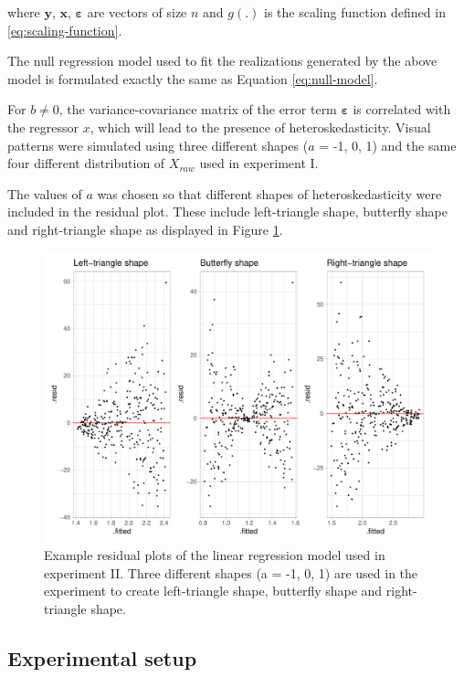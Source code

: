 \documentclass[]{interact}
\theoremstyle{plain}%
\theoremstyle{definition}
\theoremstyle{remark}
\begin{document}
where \(\boldsymbol{y}\), \(\boldsymbol{x}\),
\(\boldsymbol{\varepsilon}\) are vectors of size \(n\) and \(g(.)\) is
the scaling function defined in \ref{eq:scaling-function}.

The null regression model used to fit the realizations generated by the
above model is formulated exactly the same as Equation
\ref{eq:null-model}.

For \(b \neq 0\), the variance-covariance matrix of the error term
\(\boldsymbol{\varepsilon}\) is correlated with the regressor \(x\),
which will lead to the presence of heteroskedasticity. Visual patterns
were simulated using three different shapes (\(a\) = -1, 0, 1) and the
same four different distribution of \(X_{raw}\) used in experiment I.

The values of \(a\) was chosen so that different shapes of
heteroskedasticity were included in the residual plot. These include
left-triangle shape, butterfly shape and right-triangle shape as
displayed in Figure \ref{fig:different-shape-of-heter}.

\begin{figure}
\includegraphics[width=1\linewidth]{paper_comparison_files/figure-latex/different-shape-of-heter-1} \caption{Example residual plots of the linear regression model used in experiment II. Three different shapes (a = -1, 0, 1) are used in the experiment to create left-triangle shape, butterfly shape and right-triangle shape.}\label{fig:different-shape-of-heter}
\end{figure}

\hypertarget{experimental-setup}{%
\subsection{Experimental setup}\label{experimental-setup}}
\end{document}
